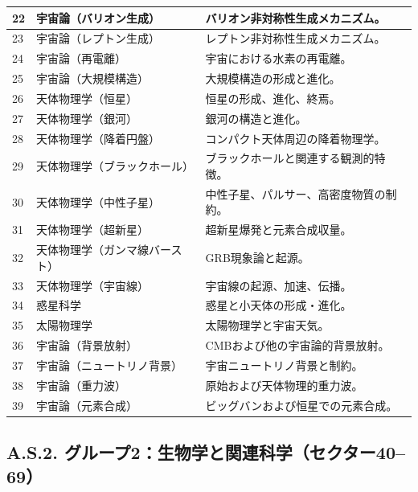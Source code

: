 \documentclass[13pt,a4paper]{ltjsarticle}
\begin{document}
\begin{longtable}{|p{0.9cm}|p{6.0cm}|p{8.6cm}|}
		22 & 宇宙論（バリオン生成） & バリオン非対称性生成メカニズム。 \\
		\hline
		23 & 宇宙論（レプトン生成） & レプトン非対称性生成メカニズム。 \\
		\hline
		24 & 宇宙論（再電離） & 宇宙における水素の再電離。 \\
		\hline
		25 & 宇宙論（大規模構造） & 大規模構造の形成と進化。 \\
		\hline
		26 & 天体物理学（恒星） & 恒星の形成、進化、終焉。 \\
		\hline
		27 & 天体物理学（銀河） & 銀河の構造と進化。 \\
		\hline
		28 & 天体物理学（降着円盤） & コンパクト天体周辺の降着物理学。 \\
		\hline
		29 & 天体物理学（ブラックホール） & ブラックホールと関連する観測的特徴。 \\
		\hline
		30 & 天体物理学（中性子星） & 中性子星、パルサー、高密度物質の制約。 \\
		\hline
		31 & 天体物理学（超新星） & 超新星爆発と元素合成収量。 \\
		\hline
		32 & 天体物理学（ガンマ線バースト） & GRB現象論と起源。 \\
		\hline
		33 & 天体物理学（宇宙線） & 宇宙線の起源、加速、伝播。 \\
		\hline
		34 & 惑星科学 & 惑星と小天体の形成・進化。 \\
		\hline
		35 & 太陽物理学 & 太陽物理学と宇宙天気。 \\
		\hline
		36 & 宇宙論（背景放射） & CMBおよび他の宇宙論的背景放射。 \\
		\hline
		37 & 宇宙論（ニュートリノ背景） & 宇宙ニュートリノ背景と制約。 \\
		\hline
		38 & 宇宙論（重力波） & 原始および天体物理的重力波。 \\
		\hline
		39 & 宇宙論（元素合成） & ビッグバンおよび恒星での元素合成。 \\
		\hline
	\end{longtable}
	
	\subsection*{A.S.2. グループ2：生物学と関連科学（セクター40--69）}
	
\end{document}
